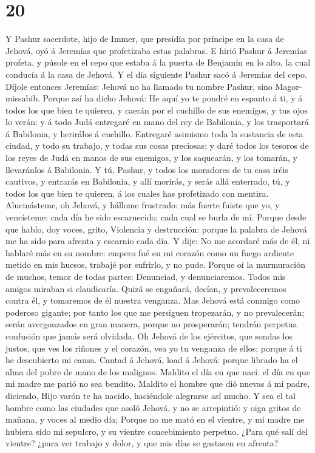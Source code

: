 \hypertarget{section-19}{%
\section{20}\label{section-19}}

 Y Pashur sacerdote, hijo de Immer, que presidía por
príncipe en la casa de Jehová, oyó á Jeremías que profetizaba estas
palabras.  E hirió Pashur á Jeremías profeta, y púsole en
el cepo que estaba á la puerta de Benjamín en lo alto, la cual conducía
á la casa de Jehová.  Y el día siguiente Pashur sacó á
Jeremías del cepo. Díjole entonces Jeremías: Jehová no ha llamado tu
nombre Pashur, sino Magor-missabib.  Porque así ha dicho
Jehová: He aquí yo te pondré en espanto á ti, y á todos los que bien te
quieren, y caerán por el cuchillo de sus enemigos, y tus ojos lo verán:
y á todo Judá entregaré en mano del rey de Babilonia, y los trasportará
á Babilonia, y herirálos á cuchillo.  Entregaré asimismo
toda la sustancia de esta ciudad, y todo su trabajo, y todas sus cosas
preciosas; y daré todos los tesoros de los reyes de Judá en manos de sus
enemigos, y los saquearán, y los tomarán, y llevaránlos á Babilonia.
 Y tú, Pashur, y todos los moradores de tu casa iréis
cautivos, y entrarás en Babilonia, y allí morirás, y serás allá
enterrado, tú, y todos los que bien te quieren, á los cuales has
profetizado con mentira.  Alucinásteme, oh Jehová, y
hállome frustrado: más fuerte fuiste que yo, y vencísteme: cada día he
sido escarnecido; cada cual se burla de mí.  Porque desde
que hablo, doy voces, grito, Violencia y destrucción: porque la palabra
de Jehová me ha sido para afrenta y escarnio cada día.  Y
dije: No me acordaré más de él, ni hablaré más en su nombre: empero fué
en mi corazón como un fuego ardiente metido en mis huesos, trabajé por
sufrirlo, y no pude.  Porque oí la murmuración de muchos,
temor de todas partes: Denunciad, y denunciaremos. Todos mis amigos
miraban si claudicaría. Quizá se engañará, decían, y prevaleceremos
contra él, y tomaremos de él nuestra venganza.  Mas
Jehová está conmigo como poderoso gigante; por tanto los que me
persiguen tropezarán, y no prevalecerán; serán avergonzados en gran
manera, porque no prosperarán; tendrán perpetua confusión que jamás será
olvidada.  Oh Jehová de los ejércitos, que sondas los
justos, que ves los riñones y el corazón, vea yo tu venganza de ellos;
porque á ti he descubierto mi causa.  Cantad á Jehová,
load á Jehová: porque librado ha el alma del pobre de mano de los
malignos.  Maldito el día en que nací: el día en que mi
madre me parió no sea bendito.  Maldito el hombre que dió
nuevas á mi padre, diciendo, Hijo varón te ha nacido, haciéndole
alegrarse así mucho.  Y sea el tal hombre como las
ciudades que asoló Jehová, y no se arrepintió: y oiga gritos de mañana,
y voces al medio día;  Porque no me mató en el vientre, y
mi madre me hubiera sido mi sepulcro, y su vientre concebimiento
perpetuo.  ¿Para qué salí del vientre? ¿para ver trabajo
y dolor, y que mis días se gastasen en afrenta?

